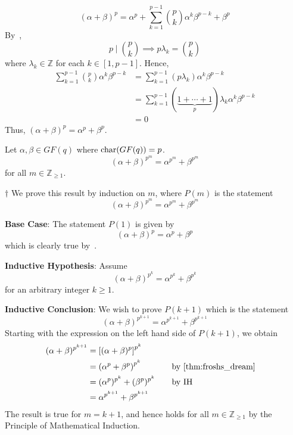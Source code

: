 \begin{Proof}{}{}
    \[ (\alpha + \beta)^p=\alpha^p+\sum\limits_{k=1}^{p-1}
        \binom{p}{k}\alpha^k\beta^{p-k}+\beta^p \]
    By~,
    \[ p\mid \binom{p}{k}\implies p\lambda_k=\binom{p}{k} \]
    where $ \lambda_k\in\mathbb{Z} $ for each $ k\in[1,p-1] $. Hence,
    \begin{align*}
        \sum\limits_{k=1}^{p-1}\binom{p}{k}\alpha^k\beta^{p-k}
         & = \sum\limits_{k=1}^{p-1} (p\lambda_k) \alpha^k\beta^{p-k}                          \\
         & =\sum\limits_{k=1}^{p-1} (\underbrace{1+\cdots+1}_{p})\lambda_k \alpha^k\beta^{p-k} \\
         & =0
    \end{align*}
    Thus, $ (\alpha + \beta)^p=\alpha^p+\beta^p $.
\end{Proof}

\begin{Corollary}{}{}
    Let $ \alpha,\beta\in GF(q) $ where $ \operatorname{char}(GF(q))=p $.
    \[ (\alpha+\beta)^{p^m}=\alpha^{p^m}+\beta^{p^m} \]
    for all $ m\in\mathbb{Z}_{\geqslant 1} $.
\end{Corollary}

\begin{Proof}{}{} $ \dagger $
    We prove this result by induction on $ m $, where $ P(m) $ is the statement
    \[ (\alpha+\beta)^{p^m}=\alpha^{p^m}+\beta^{p^m} \]

    \textbf{Base Case}: The statement $ P(1) $ is given by
    \[ (\alpha+\beta)^{p}=\alpha^p+\beta^p \]
    which is clearly true by~.

    \textbf{Inductive Hypothesis}: Assume
    \[ (\alpha+\beta)^{p^k}=\alpha^{p^k}+\beta^{p^k} \]
    for an arbitrary integer $ k\geqslant 1 $.

    \textbf{Inductive Conclusion}: We wish to prove $ P(k+1) $
    which is the statement
    \[ (\alpha+\beta)^{p^{k+1}}=\alpha^{p^{k+1}}+\beta^{p^{k+1}} \]
    Starting with the expression on the left hand side of $ P(k+1) $,
    we obtain
    \[ \begin{aligned}
            (\alpha+\beta)^{p^{k+1}}
             & =\left[ (\alpha+\beta)^{p} \right]^{p^{k}}                                             \\
             & =\left( \alpha^p+\beta^p \right)^{p^k}     & \quad & \text{by~\Cref{thm:froshs_dream}} \\
             & = (\alpha^p)^{p^k}+(\beta^p)^{p^k}         &       & \text{by IH}                      \\
             & =\alpha^{p^{k+1}}+\beta^{p^{k+1}}
        \end{aligned}
    \]
    The result is true for $ m=k+1 $, and hence holds for all $ m\in\mathbb{Z}_{\geqslant 1} $
    by the Principle of Mathematical Induction.
\end{Proof}

